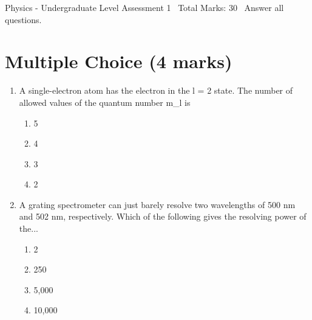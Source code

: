 \documentclass[12pt]{article}
\begin{document}
\begin{center}
Physics - Undergraduate Level Assessment 1 \
Total Marks: 30 \
Answer all questions.
\end{center}

\section*{Multiple Choice (4 marks)}
\begin{enumerate}[label=\arabic*.]
\item A single-electron atom has the electron in the l = 2 state. The number of allowed values of the quantum number m\_l is
\begin{enumerate}[label=(\alph*)]
    \item 5
    \item 4
    \item 3
    \item 2
\end{enumerate}
\item A grating spectrometer can just barely resolve two wavelengths of 500 nm and 502 nm, respectively. Which of the following gives the resolving power of the...
\begin{enumerate}[label=(\alph*)]
    \item 2
    \item 250
    \item 5,000
    \item 10,000
\end{enumerate}
\end{enumerate}
\end{document}
